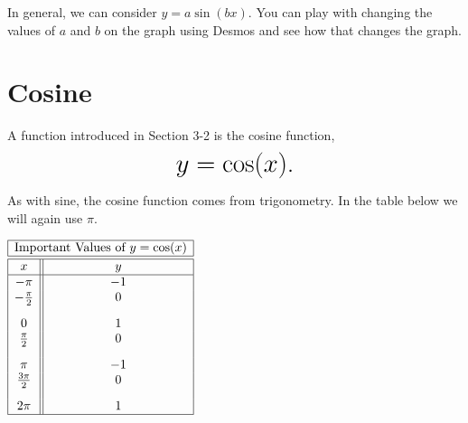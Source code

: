 \documentclass[nooutcomes]{ximera}
\begin{document}
In general, we can consider $y=a\sin(bx)$.  You can play with changing the values of $a$ and $b$ on the graph using Desmos and see how that changes the graph.  

\begin{center}  
\end{center}



\newpage


\section{Cosine}
A function introduced in Section 3-2 is the cosine function, $$ \mbox{\huge $y=\cos(x)$.}$$ 


As with sine, the cosine function comes from trigonometry. In the table below we will again use $\pi$.

\begin{image}
\end{image}

\begin{center}
\(
\begin{array}{ |c || c|  }
 \hline
 \multicolumn{2}{|c|}{\text{\normalfont Important Values of } y=\cos(x)} \\
\hline
 \hline
 x & y\\
 \hline

 -\pi&-1\\

 -\frac{\pi}{2}&0\\[2ex]

 0&1\\

 \frac{\pi}{2}&0\\[2ex]

 \pi&-1\\

\frac{3\pi}{2}&0\\[2ex]

 2 \pi&1\\
\hline
\end{array}
\)
\end{center} 
\end{document}
